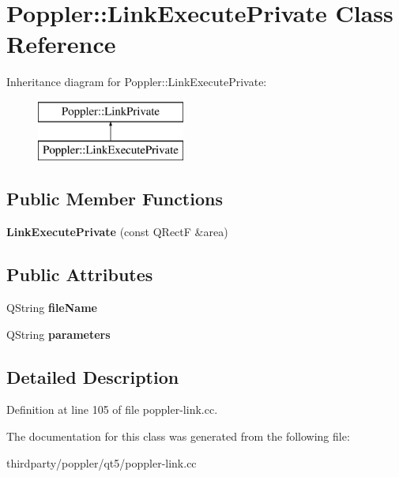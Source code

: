 \hypertarget{class_poppler_1_1_link_execute_private}{}\section{Poppler\+:\+:Link\+Execute\+Private Class Reference}
\label{class_poppler_1_1_link_execute_private}
Inheritance diagram for Poppler\+:\+:Link\+Execute\+Private\+:\begin{figure}[H]
\begin{center}
\leavevmode
\includegraphics[height=2.000000cm]{class_poppler_1_1_link_execute_private}
\end{center}
\end{figure}
\subsection*{Public Member Functions}
\begin{DoxyCompactItemize}
\item 
\mbox{\label{class_poppler_1_1_link_execute_private_adc176b2b3a5d74455a97622a5da23741}} 
{\bfseries Link\+Execute\+Private} (const Q\+RectF \&area)
\end{DoxyCompactItemize}
\subsection*{Public Attributes}
\begin{DoxyCompactItemize}
\item 
\mbox{\label{class_poppler_1_1_link_execute_private_aa25d6b47234f2bc9f75473b2273e9a3f}} 
Q\+String {\bfseries file\+Name}
\item 
\mbox{\label{class_poppler_1_1_link_execute_private_a0e2435b8529a2fc5dbbc26ea6204d117}} 
Q\+String {\bfseries parameters}
\end{DoxyCompactItemize}


\subsection{Detailed Description}


Definition at line 105 of file poppler-\/link.\+cc.



The documentation for this class was generated from the following file\+:\begin{DoxyCompactItemize}
\item 
thirdparty/poppler/qt5/poppler-\/link.\+cc\end{DoxyCompactItemize}
